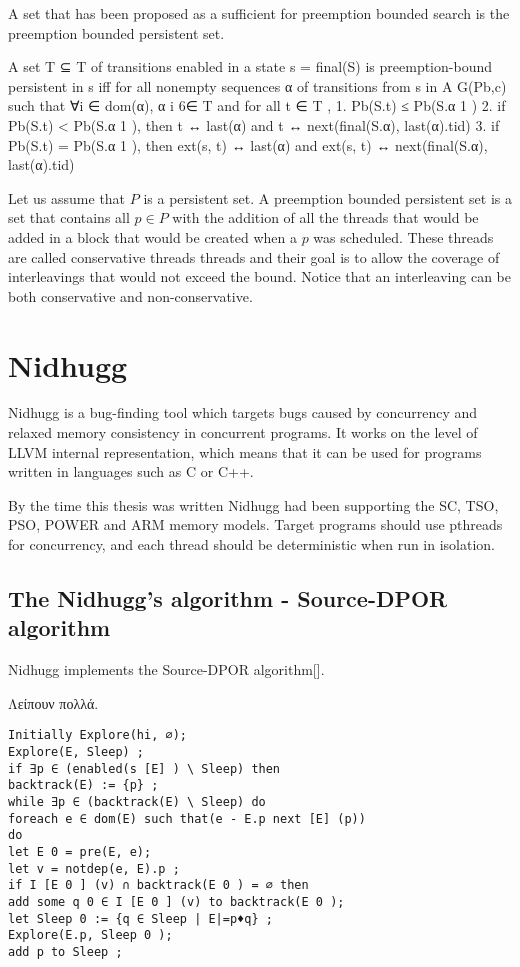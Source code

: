 \documentclass[a4paper,10pt]{article}
\begin{document}
A set that has been proposed as a sufficient for preemption bounded search is the preemption bounded persistent set.

A set T ⊆ T of transitions enabled in a state s = final(S)
is preemption-bound persistent in s iff for all nonempty
sequences α of transitions from s in A G(Pb,c) such that
∀i ∈ dom(α), α i 6∈ T and for all t ∈ T ,
1. Pb(S.t) ≤ Pb(S.α 1 )
2. if Pb(S.t) < Pb(S.α 1 ), then t ↔ last(α) and
t ↔ next(final(S.α), last(α).tid)
3. if Pb(S.t) = Pb(S.α 1 ), then ext(s, t) ↔ last(α) and
ext(s, t) ↔ next(final(S.α), last(α).tid)

Let us assume that $P$ is a persistent set. A preemption bounded persistent set is a set that contains all $p \in P$ with the addition of all the 
threads that would be added in a block that would be created when a $p$ was scheduled. These threads are called conservative threads threads and their 
goal is to allow the coverage of interleavings that would not exceed the bound. Notice that an interleaving can be both conservative and non-conservative.

\section{Nidhugg}

Nidhugg is a bug-finding tool which targets bugs caused by concurrency
and relaxed memory consistency in concurrent programs. It works on the
level of LLVM internal representation, which means that it can be used
for programs written in languages such as C or C++.

By the time this thesis was written Nidhugg had been supporting the SC, TSO, PSO, POWER and ARM memory
models. Target programs should use pthreads for concurrency, and each
thread should be deterministic when run in isolation.

\subsection{The Nidhugg's algorithm - Source-DPOR algorithm}

Nidhugg implements the Source-DPOR algorithm[].

Λείπουν πολλά.
\begin{verbatim}
Initially Explore(hi, ∅);
Explore(E, Sleep) ;
if ∃p ∈ (enabled(s [E] ) \ Sleep) then
backtrack(E) := {p} ;
while ∃p ∈ (backtrack(E) \ Sleep) do
foreach e ∈ dom(E) such that(e - E.p next [E] (p))
do
let E 0 = pre(E, e);
let v = notdep(e, E).p ;
if I [E 0 ] (v) ∩ backtrack(E 0 ) = ∅ then
add some q 0 ∈ I [E 0 ] (v) to backtrack(E 0 );
let Sleep 0 := {q ∈ Sleep | E|=p♦q} ;
Explore(E.p, Sleep 0 );
add p to Sleep ;
\end{verbatim}
\end{document}
